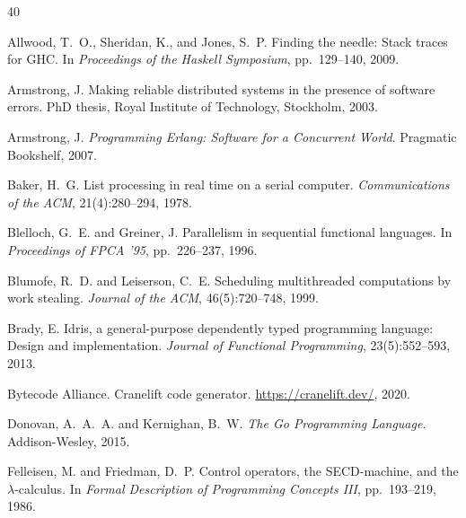 \documentclass[11pt,twocolumn]{article}
\begin{document}


\begin{thebibliography}{40}

Allwood, T.~O., Sheridan, K., and Jones, S.~P.
\newblock Finding the needle: Stack traces for GHC.
\newblock In \emph{Proceedings of the Haskell Symposium}, pp.~129--140, 2009.

Armstrong, J.
\newblock Making reliable distributed systems in the presence of software errors.
\newblock PhD thesis, Royal Institute of Technology, Stockholm, 2003.

Armstrong, J.
\newblock \emph{Programming Erlang: Software for a Concurrent World}.
\newblock Pragmatic Bookshelf, 2007.

Baker, H.~G.
\newblock List processing in real time on a serial computer.
\newblock \emph{Communications of the ACM}, 21(4):280--294, 1978.

Blelloch, G.~E. and Greiner, J.
\newblock Parallelism in sequential functional languages.
\newblock In \emph{Proceedings of FPCA '95}, pp.~226--237, 1996.

Blumofe, R.~D. and Leiserson, C.~E.
\newblock Scheduling multithreaded computations by work stealing.
\newblock \emph{Journal of the ACM}, 46(5):720--748, 1999.

Brady, E.
\newblock Idris, a general-purpose dependently typed programming language: Design and implementation.
\newblock \emph{Journal of Functional Programming}, 23(5):552--593, 2013.

Bytecode Alliance.
\newblock Cranelift code generator.
\newblock \url{https://cranelift.dev/}, 2020.

Donovan, A.~A.~A. and Kernighan, B.~W.
\newblock \emph{The Go Programming Language}.
\newblock Addison-Wesley, 2015.

Felleisen, M. and Friedman, D.~P.
\newblock Control operators, the SECD-machine, and the $\lambda$-calculus.
\newblock In \emph{Formal Description of Programming Concepts III}, pp.~193--219, 1986.


\end{thebibliography}
\end{document}
